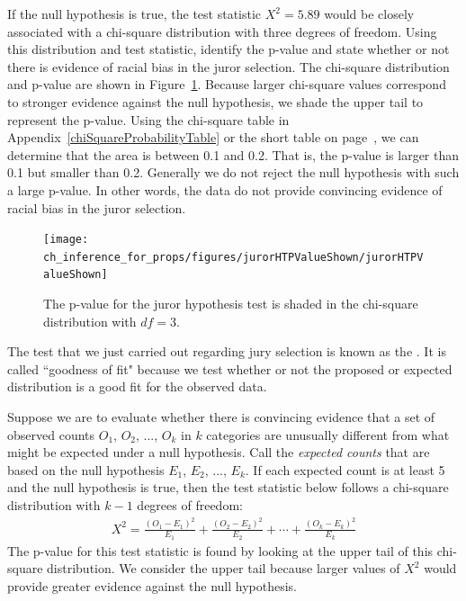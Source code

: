 \begin{example}{If the null hypothesis is true, the test statistic $X^2=5.89$ would be closely associated with a chi-square distribution with three degrees of freedom. Using this distribution and test statistic, identify the p-value and state whether or not there is evidence of racial bias in the juror selection.}
The chi-square distribution and p-value are shown in Figure~\ref{jurorHTPValueShown}. Because larger chi-square values correspond to stronger evidence against the null hypothesis, we shade the upper tail to represent the p-value. Using the chi-square table in Appendix~\ref{chiSquareProbabilityTable} or the short table on page~\pageref{chiSquareProbabilityTableShort}, we can determine that the area is between 0.1 and 0.2. That is, the p-value is larger than 0.1 but smaller than 0.2. Generally we do not reject the null hypothesis with such a large p-value. In other words, the data do not provide convincing evidence of racial bias in the juror selection.
\end{example}

\begin{figure}[h]
\centering
\texttt{[image: ch\_inference\_for\_props/figures/jurorHTPValueShown/jurorHTPValueShown]}
\caption{The p-value for the juror hypothesis test is shaded in the chi-square distribution with $df=3$.}
\label{jurorHTPValueShown}
\end{figure}

The test that we just carried out regarding jury selection is known as the . It is called ``goodness of fit" because we test whether or not the proposed or expected distribution is a good fit for the observed data.

\begin{termBox}{
Suppose we are to evaluate whether there is convincing evidence that a set of observed counts $O_1$, $O_2$, ..., $O_k$ in $k$ categories are unusually different from what might be expected under a null hypothesis. Call the \emph{expected counts} that are based on the null hypothesis $E_1$, $E_2$, ..., $E_k$. If each expected count is at least 5 and the null hypothesis is true, then the test statistic below follows a chi-square distribution with $k-1$ degrees of freedom:
\begin{align*}
X^2 = \frac{(O_1 - E_1)^2}{E_1} + \frac{(O_2 - E_2)^2}{E_2} + \cdots + \frac{(O_k - E_k)^2}{E_k}
\end{align*}
The p-value for this test statistic is found by looking at the upper tail of this chi-square distribution. We consider the upper tail because larger values of $X^2$ would provide greater evidence against the null hypothesis.}
\end{termBox}

